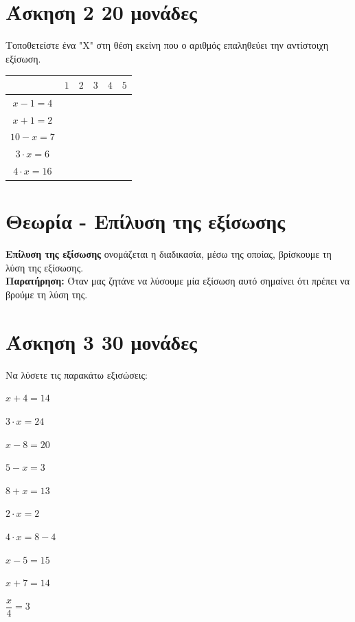 \documentclass[a4paper,10pt]{report}
\begin{document}
\section*{Άσκηση 2  \hfill \small{20 μονάδες}}
Τοποθετείστε ένα "Χ" στη θέση εκείνη που ο αριθμός επαληθεύει την αντίστοιχη εξίσωση. 
\begin{center}
 \begin{tabular}{|c|c|c|c|c|c|}\hline 
                       & $1$ & $2$ & $3$ & $4$ & $5$          \\
\hline 
$x-1=4$                &     &     &     &     &       \\
\hline 
$x+1=2$                &     &     &     &     &       \\                    
\hline 
$10-x=7$               &     &     &     &     &       \\
\hline 
$3\cdot x=6 $          &     &     &     &     &       \\
\hline 
$4\cdot x=16 $          &     &     &     &     &       \\
\hline 
\end{tabular}
\end{center}



\section*{Θεωρία - Επίλυση της εξίσωσης \hfill \small{}}
\textbf{Επίλυση της εξίσωσης} ονομάζεται η διαδικασία, μέσω της οποίας, βρίσκουμε τη λύση της εξίσωσης.\\
\textbf{Παρατήρηση:} Όταν μας ζητάνε να λύσουμε μία εξίσωση αυτό σημαίνει ότι πρέπει να βρούμε τη λύση της.


\section*{Άσκηση 3  \hfill \small{30 μονάδες}}
Να λύσετε τις παρακάτω εξισώσεις:
\begin{enumerate}[1)]
\begin{multicols}{2}
 \item $x+4=14$
 \item $3\cdot x =24$
 \item $x-8=20$
 \item $5-x=3$
 \item $8+x=13$
 \item $2\cdot x=2$
 \item $4\cdot x=8-4$
 \item $x-5=15$
 \item $x+7=14$
 \item $\dfrac{x}{4}=3$
\end{multicols}
\end{enumerate}
\end{document}
